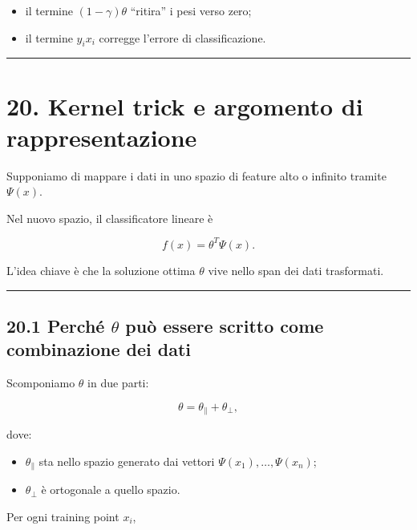\documentclass[
]{article}
\providecommand{\tightlist}{%
  \setlength{\itemsep}{0pt}\setlength{\parskip}{0pt}}
\begin{document}
\begin{itemize}
\tightlist
\item
  il termine \((1-\gamma)\theta\) ``ritira'' i pesi verso zero;
\item
  il termine \(y_i x_i\) corregge l'errore di classificazione.
\end{itemize}

\begin{center}\rule{0.5\linewidth}{0.5pt}\end{center}

\section{20. Kernel trick e argomento di
rappresentazione}\label{kernel-trick-e-argomento-di-rappresentazione}

Supponiamo di mappare i dati in uno spazio di feature alto o infinito
tramite \(\Psi(x)\).

Nel nuovo spazio, il classificatore lineare è

\[
f(x)=\theta^T\Psi(x).
\]

L'idea chiave è che la soluzione ottima \(\theta\) vive nello span dei
dati trasformati.

\begin{center}\rule{0.5\linewidth}{0.5pt}\end{center}

\subsection{\texorpdfstring{20.1 Perché \(\theta\) può essere scritto
come combinazione dei
dati}{20.1 Perché \textbackslash theta può essere scritto come combinazione dei dati}}\label{perchuxe9-theta-puuxf2-essere-scritto-come-combinazione-dei-dati}

Scomponiamo \(\theta\) in due parti:

\[
\theta = \theta_{\parallel} + \theta_{\perp},
\]

dove:

\begin{itemize}
\tightlist
\item
  \(\theta_{\parallel}\) sta nello spazio generato dai vettori
  \(\Psi(x_1),\dots,\Psi(x_n)\);
\item
  \(\theta_{\perp}\) è ortogonale a quello spazio.
\end{itemize}

Per ogni training point \(x_i\),
\end{document}
